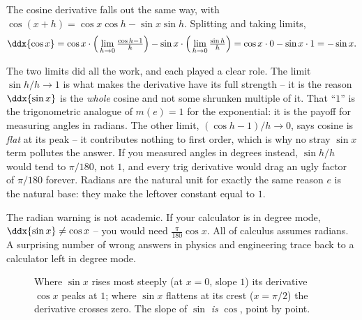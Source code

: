 The cosine derivative falls out the same way, with
$\cos(x+h)=\cos x\cos h - \sin x\sin h$. Splitting and taking limits,
\[
\ddx{\cos x}
= \cos x\cdot\Big(\lim_{h\to0}\tfrac{\cos h-1}{h}\Big)
 - \sin x\cdot\Big(\lim_{h\to0}\tfrac{\sin h}{h}\Big)
= \cos x\cdot 0 - \sin x\cdot 1 = -\sin x.
\]

\begin{happeningbox}
The two limits did all the work, and each played a clear role. The limit
$\sin h/h\to 1$ is what makes the derivative have its full strength -- it is
the reason $\ddx{\sin x}$ is the \emph{whole} cosine and not some shrunken
multiple of it. That ``$1$'' is the trigonometric analogue of $m(e)=1$ for
the exponential: it is the payoff for measuring angles in radians. The other
limit, $(\cos h-1)/h\to 0$, says cosine is \emph{flat} at its peak -- it
contributes nothing to first order, which is why no stray $\sin x$ term
pollutes the answer. If you measured angles in degrees instead, $\sin h/h$
would tend to $\pi/180$, not $1$, and every trig derivative would drag an
ugly factor of $\pi/180$ forever. Radians are the natural unit for exactly
the same reason $e$ is the natural base: they make the leftover constant
equal to $1$.
\end{happeningbox}

\begin{trapbox}
The radian warning is not academic. If your calculator is in degree mode,
$\ddx{\sin x}\neq\cos x$ -- you would need $\frac{\pi}{180}\cos x$. All of
calculus assumes radians. A surprising number of wrong answers in physics
and engineering trace back to a calculator left in degree mode.
\end{trapbox}

\begin{figure}[H]
\centering
{}
\caption{Where $\sin x$ rises most steeply (at $x=0$, slope $1$) its
derivative $\cos x$ peaks at $1$; where $\sin x$ flattens at its crest
($x=\pi/2$) the derivative crosses zero. The slope of $\sin$ \emph{is}
$\cos$, point by point.}
\label{ch12:fig-sin-cos}
\end{figure}

